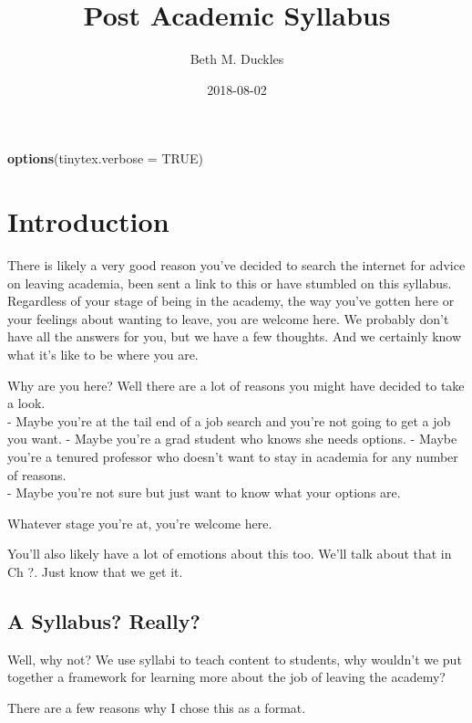 \documentclass[]{book}
\title{Post Academic Syllabus}
\author{Beth M. Duckles}
\date{2018-08-02}
\newenvironment{Shaded}{\begin{snugshade}}{\end{snugshade}}
\newcommand{\KeywordTok}[1]{\textcolor[rgb]{0.13,0.29,0.53}{\textbf{#1}}}
\newcommand{\DataTypeTok}[1]{\textcolor[rgb]{0.13,0.29,0.53}{#1}}
\newcommand{\OtherTok}[1]{\textcolor[rgb]{0.56,0.35,0.01}{#1}}
\newcommand{\NormalTok}[1]{#1}
\theoremstyle{definition}
\theoremstyle{definition}
\theoremstyle{definition}
\theoremstyle{remark}
\begin{document}
\maketitle

{
\setcounter{tocdepth}{1}
\tableofcontents
}
\begin{Shaded}
\begin{Highlighting}[]
\KeywordTok{options}\NormalTok{(}\DataTypeTok{tinytex.verbose =} \OtherTok{TRUE}\NormalTok{)}
\end{Highlighting}
\end{Shaded}

\chapter{Introduction}\label{introduction}

There is likely a very good reason you've decided to search the internet
for advice on leaving academia, been sent a link to this or have
stumbled on this syllabus. Regardless of your stage of being in the
academy, the way you've gotten here or your feelings about wanting to
leave, you are welcome here. We probably don't have all the answers for
you, but we have a few thoughts. And we certainly know what it's like to
be where you are.

Why are you here? Well there are a lot of reasons you might have decided
to take a look.\\
- Maybe you're at the tail end of a job search and you're not going to
get a job you want. - Maybe you're a grad student who knows she needs
options. - Maybe you're a tenured professor who doesn't want to stay in
academia for any number of reasons.\\
- Maybe you're not sure but just want to know what your options are.

Whatever stage you're at, you're welcome here.

You'll also likely have a lot of emotions about this too. We'll talk
about that in Ch ?. Just know that we get it.

\section{A Syllabus? Really?}\label{a-syllabus-really}

Well, why not? We use syllabi to teach content to students, why wouldn't
we put together a framework for learning more about the job of leaving
the academy?

There are a few reasons why I chose this as a format.
\end{document}
